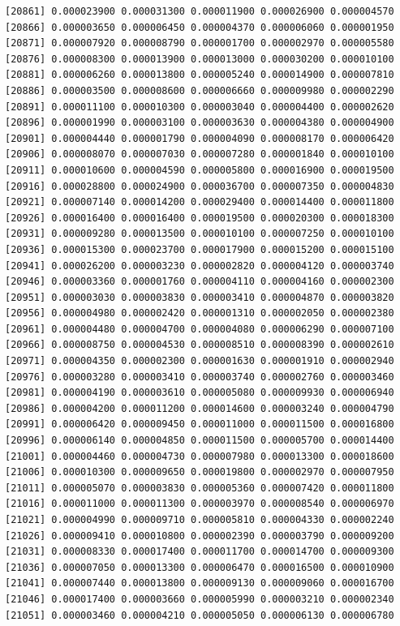\documentclass[]{article}
\begin{document}
\begin{verbatim}
[20861] 0.000023900 0.000031300 0.000011900 0.000026900 0.000004570
[20866] 0.000003650 0.000006450 0.000004370 0.000006060 0.000001950
[20871] 0.000007920 0.000008790 0.000001700 0.000002970 0.000005580
[20876] 0.000008300 0.000013900 0.000013000 0.000030200 0.000010100
[20881] 0.000006260 0.000013800 0.000005240 0.000014900 0.000007810
[20886] 0.000003500 0.000008600 0.000006660 0.000009980 0.000002290
[20891] 0.000011100 0.000010300 0.000003040 0.000004400 0.000002620
[20896] 0.000001990 0.000003100 0.000003630 0.000004380 0.000004900
[20901] 0.000004440 0.000001790 0.000004090 0.000008170 0.000006420
[20906] 0.000008070 0.000007030 0.000007280 0.000001840 0.000010100
[20911] 0.000010600 0.000004590 0.000005800 0.000016900 0.000019500
[20916] 0.000028800 0.000024900 0.000036700 0.000007350 0.000004830
[20921] 0.000007140 0.000014200 0.000029400 0.000014400 0.000011800
[20926] 0.000016400 0.000016400 0.000019500 0.000020300 0.000018300
[20931] 0.000009280 0.000013500 0.000010100 0.000007250 0.000010100
[20936] 0.000015300 0.000023700 0.000017900 0.000015200 0.000015100
[20941] 0.000026200 0.000003230 0.000002820 0.000004120 0.000003740
[20946] 0.000003360 0.000001760 0.000004110 0.000004160 0.000002300
[20951] 0.000003030 0.000003830 0.000003410 0.000004870 0.000003820
[20956] 0.000004980 0.000002420 0.000001310 0.000002050 0.000002380
[20961] 0.000004480 0.000004700 0.000004080 0.000006290 0.000007100
[20966] 0.000008750 0.000004530 0.000008510 0.000008390 0.000002610
[20971] 0.000004350 0.000002300 0.000001630 0.000001910 0.000002940
[20976] 0.000003280 0.000003410 0.000003740 0.000002760 0.000003460
[20981] 0.000004190 0.000003610 0.000005080 0.000009930 0.000006940
[20986] 0.000004200 0.000011200 0.000014600 0.000003240 0.000004790
[20991] 0.000006420 0.000009450 0.000011000 0.000011500 0.000016800
[20996] 0.000006140 0.000004850 0.000011500 0.000005700 0.000014400
[21001] 0.000004460 0.000004730 0.000007980 0.000013300 0.000018600
[21006] 0.000010300 0.000009650 0.000019800 0.000002970 0.000007950
[21011] 0.000005070 0.000003830 0.000005360 0.000007420 0.000011800
[21016] 0.000011000 0.000011300 0.000003970 0.000008540 0.000006970
[21021] 0.000004990 0.000009710 0.000005810 0.000004330 0.000002240
[21026] 0.000009410 0.000010800 0.000002390 0.000003790 0.000009200
[21031] 0.000008330 0.000017400 0.000011700 0.000014700 0.000009300
[21036] 0.000007050 0.000013300 0.000006470 0.000016500 0.000010900
[21041] 0.000007440 0.000013800 0.000009130 0.000009060 0.000016700
[21046] 0.000017400 0.000003660 0.000005990 0.000003210 0.000002340
[21051] 0.000003460 0.000004210 0.000005050 0.000006130 0.000006780

\end{verbatim}
\end{document}
